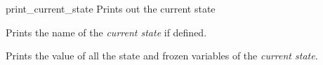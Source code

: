 \begin{nusmvCommand}{print\_current\_state} {Prints out the current state}


Prints the name of the \emph{current state} if defined.

\begin{cmdOpt}
 {Prints the value of all the state and frozen variables of the
\emph{current state}.}
\end{cmdOpt}

\end{nusmvCommand}

